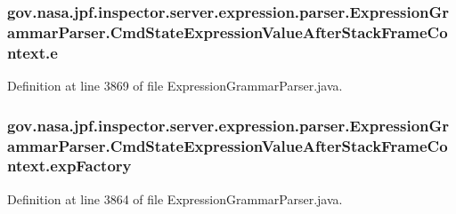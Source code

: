 \subsubsection[{\texorpdfstring{e}{e}}]{ gov.\+nasa.\+jpf.\+inspector.\+server.\+expression.\+parser.\+Expression\+Grammar\+Parser.\+Cmd\+State\+Expression\+Value\+After\+Stack\+Frame\+Context.\+e}\hypertarget{classgov_1_1nasa_1_1jpf_1_1inspector_1_1server_1_1expression_1_1parser_1_1_expression_grammar_pa89116a9ed8dad2a185081bb1175595f7_a8d286f3cb4f78253c28f725c0d0f8d92}{}\label{classgov_1_1nasa_1_1jpf_1_1inspector_1_1server_1_1expression_1_1parser_1_1_expression_grammar_pa89116a9ed8dad2a185081bb1175595f7_a8d286f3cb4f78253c28f725c0d0f8d92}


Definition at line 3869 of file Expression\+Grammar\+Parser.\+java.

\subsubsection[{\texorpdfstring{exp\+Factory}{expFactory}}]{ gov.\+nasa.\+jpf.\+inspector.\+server.\+expression.\+parser.\+Expression\+Grammar\+Parser.\+Cmd\+State\+Expression\+Value\+After\+Stack\+Frame\+Context.\+exp\+Factory}\hypertarget{classgov_1_1nasa_1_1jpf_1_1inspector_1_1server_1_1expression_1_1parser_1_1_expression_grammar_pa89116a9ed8dad2a185081bb1175595f7_af5f64686b23dd22157ef756b0b17df89}{}\label{classgov_1_1nasa_1_1jpf_1_1inspector_1_1server_1_1expression_1_1parser_1_1_expression_grammar_pa89116a9ed8dad2a185081bb1175595f7_af5f64686b23dd22157ef756b0b17df89}


Definition at line 3864 of file Expression\+Grammar\+Parser.\+java.

